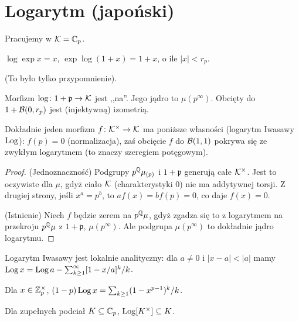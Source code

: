 \section{Logarytm (japoński)}
Pracujemy  w $\mathcal K = \mathbb C_p$.

\begin{fakt}
	$\log \exp x = x$, $\exp \log (1+x) = 1 +x$, o ile $|x| < r_p$.
\end{fakt}

(To było tylko przypomnienie).

\begin{wniosek}
	Morfizm $\log \colon 1 + \mathfrak p \to \mathcal K$ jest ,,na''.
	Jego jądro to $\mu(p^\infty)$.
	Obcięty do $1 + \mathcal B(0, r_p)$ jest (injektywną) izometrią.
\end{wniosek}

\begin{fakt}
	Dokładnie jeden morfizm $f \colon \mathcal K^\times \to \mathcal K$ ma poniższe własności (logarytm Iwasawy $\operatorname{Log}$): $f(p) = 0$ (normalizacja), zaś obcięcie $f$ do $\mathcal B(1,1)$ pokrywa się ze zwykłym logarytmem (to znaczy szeregiem potęgowym).
\end{fakt}

\begin{proof}
	(Jednoznaczność) Podgrupy $p^\mathbb Q\mu_{(p)}$ i $1 + \mathfrak p$ generują całe $\mathcal K^\times$.
	Jest to oczywiste dla $\mu$, gdyż ciało $\mathcal K$ (charakterystyki 0) nie ma addytywnej torsji.
	Z drugiej strony, jeśli $x^a = p^b$, to $af(x) = bf(p) = 0$, co daje $f(x) = 0$.

	(Istnienie) Niech $f$ będzie zerem na $p^\mathbb Q\mu$, gdyż zgadza się to z logarytmem na przekroju $p^\mathbb Q\mu$ z $1 + \mathfrak p$, $\mu(p^\infty)$.
	Ale podgrupa $\mu(p^\infty)$ to dokładnie jądro logarytmu.
\end{proof}

\begin{fakt}
	Logarytm Iwasawy jest lokalnie analityczny: dla $a \neq 0$ i $|x - a| < |a|$ mamy
	$\operatorname{Log} x = \operatorname{Log} a - \sum_{k \ge 1}^\infty [1 - x/a]^k / k$.
\end{fakt}

\begin{fakt}
	Dla $x \in \mathbb Z_p^\times$, $(1-p)\operatorname{Log} x = \sum_{k \ge 1} (1-x^{p-1})^k / k$.
\end{fakt}

\begin{fakt}
	Dla zupełnych podciał $K \subseteq \mathbb C_p$, $\operatorname{Log}[K^\times] \subseteq K$.
\end{fakt}

